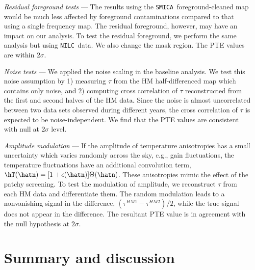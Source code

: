 \documentclass[aps,prd,twocolumn,superscriptaddress,groupedaddress,nofootinbib]{revtex4}
\def\T{\Theta}
\def\SMICA{{\tt SMICA}}
\def\NILC{{\tt NILC}}
\begin{document}
\bi
\item {\it Residual foreground tests} --- 
The results using the \SMICA\ foreground-cleaned map would be much less affected by foreground contaminations 
compared to that using a single frequency map. 
The residual foreground, however, may have an impact on our analysis. 
To test the residual foreground, we perform the same analysis but using \NILC\ data. 
We also change the mask region. 
The PTE values are within $2\sigma$. 
\item {\it Noise tests} --- 
We applied the noise scaling in the baseline analysis. 
We test this noise assumption by 1) measuring $\tau$ from the HM half-differenced map 
which contains only noise, and 2) computing cross correlation of $\tau$ reconstructed from 
the first and second halves of the HM data. 
Since the noise is almost uncorrelated between two data sets observed during different years, 
the cross correlation of $\tau$ is expected to be noise-independent. 
We find that the PTE values are consistent with null at $2\sigma$ level.
\item {\it Amplitude modulation} ---
If the amplitude of temperature anisotropies has a small uncertainty which varies randomly across the sky, 
e.g., gain fluctuations, the temperature fluctuations have an additional convolution term, 
$\hT(\hatn)=[1+\epsilon(\hatn)]\T(\hatn)$. These anisotropies mimic the effect of the patchy screening. 
To test the modulation of amplitude, we reconstruct $\tau$ from each HM data and differentiate them.
The random modulation leads to a nonvanishing signal in the difference, 
$(\tau^{HM1}-\tau^{HM2})/2$, while the true signal does not appear in the difference. 
The resultant PTE value is in agreement with the null hypothesis at $2\sigma$. 
\ei

\section{Summary and discussion} \label{summary}
\end{document}
